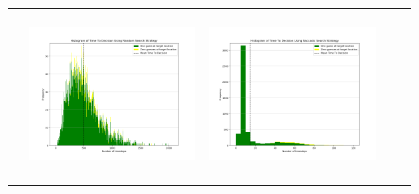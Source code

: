 \begin{landscape}
\begin{table}[h!]
\begin{tabular}{ | c | c | c | c | c |}
\begin{minipage}[c][45mm][c]{45mm}
    \end{minipage}
    &
    \begin{minipage}[c][45mm][c]{45mm}
      \includegraphics[width=44mm, height=44mm]{Chapters/MultiAgentTargetDetection/Figs/Histograms/VaryingPrior/Gaussian/GaussianRandomHistogram.png}
    \end{minipage}
    &
    \begin{minipage}[c][45mm][c]{45mm}
      \includegraphics[width=44mm, height=44mm]{Chapters/MultiAgentTargetDetection/Figs/Histograms/VaryingPrior/Gaussian/GaussianSaccadicHistogram.png}
    \end{minipage}
    \\


\end{tabular}
\end{table}
\end{landscape}

